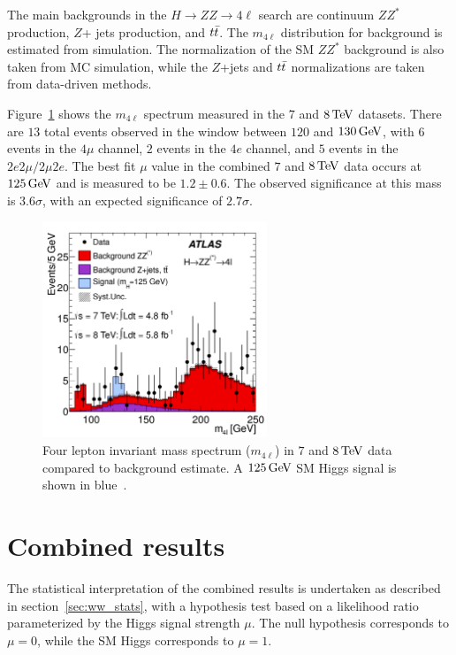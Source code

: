 The main backgrounds in the $H\to ZZ \to 4\ell$ search are continuum $ZZ^*$ production, $Z$+ jets production, and $t\bar{t}$. The $m_{4\ell}$ distribution for background is estimated from simulation. The normalization of the SM $ZZ^*$ background is also taken from MC simulation, while the $Z$+jets and $t\bar{t}$ normalizations are taken from data-driven methods.

Figure~\ref{fig:disc_zz_result} shows the $m_{4\ell}$ spectrum measured in the $7$ and $8 \TeV$ datasets. There are $13$ total events observed in the window between $120$ and $130 \GeV$, with $6$ events in the $4\mu$ channel, $2$ events in the $4e$ channel, and $5$ events in the $2e2\mu/2\mu2e$. The best fit $\mu$ value in the combined $7$ and $8 \TeV$ data occurs at $125 \GeV$ and is measured to be $1.2 \pm 0.6$. The observed significance at this mass is $3.6\sigma$, with an expected significance of $2.7\sigma$. 

\begin{figure}[h!]
  \centering
  \captionsetup{justification=centering}
  \includegraphics[width=0.6\textwidth]{figures/discovery_m4l}
  \caption{Four lepton invariant mass spectrum ($m_{4\ell}$) in $7$ and $8 \TeV$ data compared to background estimate. A $125 \GeV$ SM Higgs signal is shown in blue~\cite{Discovery}.}
  \label{fig:disc_zz_result}
\end{figure}

\section{Combined results}

The statistical interpretation of the combined results is undertaken as described in section~\ref{sec:ww_stats}, with a hypothesis test based on a likelihood ratio parameterized by the Higgs signal strength $\mu$. The null hypothesis corresponds to $\mu = 0$, while the SM Higgs corresponds to $\mu = 1$. 

